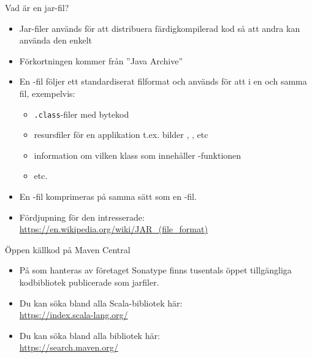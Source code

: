 \begin{Slide}{Vad är en jar-fil?}
\begin{itemize}
  \item Jar-filer används för att distribuera färdigkompilerad kod så att andra kan använda den enkelt
  \item Förkortningen  kommer från ''Java Archive''
  \item En -fil följer ett standardiserat filformat och används för att  i en och samma fil, exempelvis:
  \begin{itemize}
    \item \texttt{.class}-filer med bytekod
    \item resursfiler för en applikation t.ex. bilder , , etc
    \item information om vilken klass som innehåller -funktionen
    \item etc.
  \end{itemize}
  \item En -fil komprimeras på samma sätt som en -fil.
  \item Fördjupning för den intresserade:\\
  {\SlideFontTiny\url{https://en.wikipedia.org/wiki/JAR_(file_format)}}
\end{itemize}
\end{Slide}

\begin{Slide}{Öppen källkod på Maven Central}
\begin{itemize}
  \item På  som hanteras av företaget Sonatype finns tusentals öppet tillgängliga kodbibliotek publicerade som jarfiler.
  \item Du kan söka bland alla Scala-bibliotek här: \\\url{https://index.scala-lang.org/}
  \item Du kan söka bland alla bibliotek här: \\\url{https://search.maven.org/}
\end{itemize}
\end{Slide}


